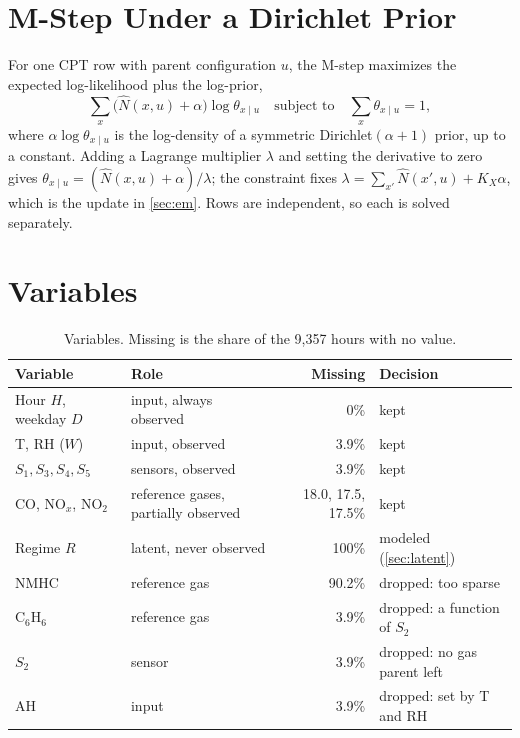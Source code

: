 
\FloatBarrier
\section{M-Step Under a Dirichlet Prior}
\label{app:em}
For one CPT row with parent configuration $u$, the M-step maximizes the
expected log-likelihood plus the log-prior,
\begin{equation*}
  \sum_x \bigl(\hat N(x,u) + \alpha\bigr) \log \theta_{x \mid u}
  \quad\text{subject to}\quad \sum_x \theta_{x \mid u} = 1,
\end{equation*}
where $\alpha \log \theta_{x \mid u}$ is the log-density of a symmetric
Dirichlet$(\alpha + 1)$ prior, up to a constant. Adding a Lagrange multiplier
$\lambda$ and setting the derivative to zero gives
$\theta_{x \mid u} = (\hat N(x,u) + \alpha)/\lambda$; the constraint fixes
$\lambda = \sum_{x'} \hat N(x',u) + K_X \alpha$, which is the update in
\cref{sec:em}. Rows are independent, so each is solved separately.


\FloatBarrier
\section{Variables}
\label{app:variables}
\begin{table}[h]
    \centering\small
    \setlength{\tabcolsep}{4pt}
    \caption{Variables. Missing is the share of the 9,357 hours with no value.}
    \label{tab:variables}
    \begin{tabular}{@{}llrl@{}}
        \toprule
        Variable & Role & Missing & Decision \\
        \midrule
        Hour $H$, weekday $D$ & input, always observed & 0\% & kept \\
        T, RH ($W$) & input, observed & 3.9\% & kept \\
        $S_1, S_3, S_4, S_5$ & sensors, observed & 3.9\% & kept \\
        CO, NO$_x$, NO$_2$ & reference gases, partially observed & 18.0, 17.5, 17.5\% & kept \\
        Regime $R$ & latent, never observed & 100\% & modeled (\cref{sec:latent}) \\
        \midrule
        NMHC & reference gas & 90.2\% & dropped: too sparse \\
        C$_6$H$_6$ & reference gas & 3.9\% & dropped: a function of $S_2$ \\
        $S_2$ & sensor & 3.9\% & dropped: no gas parent left \\
        AH & input & 3.9\% & dropped: set by T and RH \\
        \bottomrule
    \end{tabular}
\end{table}

